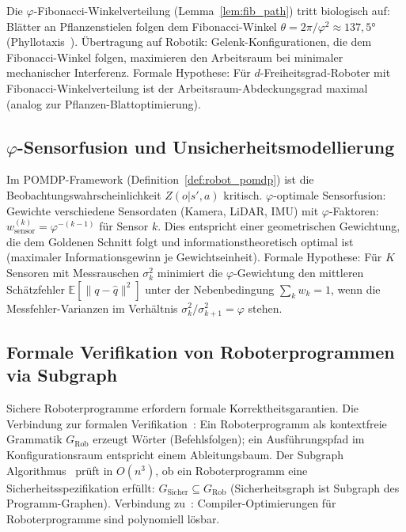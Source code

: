 ﻿\documentclass[a4paper,12pt]{article}
\theoremstyle{definition}
\begin{document}
Die $\varphi$-Fibonacci-Winkelverteilung (Lemma~\ref{lem:fib_path})
tritt biologisch auf: Bl\"atter an Pflanzenstielen folgen dem
Fibonacci-Winkel $\theta = 2\pi/\varphi^2 \approx 137{,}5 °$ (Phyllotaxis~\cite{epp2026expl}).
\"Ubertragung auf Robotik: Gelenk-Konfigurationen, die dem Fibonacci-Winkel
folgen, maximieren den Arbeitsraum bei minimaler mechanischer Interferenz.
Formale Hypothese: F\"ur $d$-Freiheitsgrad-Roboter mit Fibonacci-Winkelverteilung
ist der Arbeitsraum-Abdeckungsgrad maximal (analog zur Pflanzen-Blattoptimierung).

\subsection{$\varphi$-Sensorfusion und Unsicherheitsmodellierung}

Im POMDP-Framework (Definition~\ref{def:robot_pomdp}) ist die
Beobachtungswahrscheinlichkeit $Z(o|s',a)$ kritisch.
$\varphi$-optimale Sensorfusion: Gewichte verschiedene Sensordaten
(Kamera, LiDAR, IMU) mit $\varphi$-Faktoren:
$w_{\mathrm{sensor}}^{(k)} = \varphi^{-(k-1)}$ f\"ur Sensor $k$.
Dies entspricht einer geometrischen Gewichtung, die dem
Goldenen Schnitt folgt und informationstheoretisch optimal ist
(maximaler Informationsgewinn je Gewichtseinheit).
Formale Hypothese: F\"ur $K$ Sensoren mit Messrauschen $\sigma_k^2$
minimiert die $\varphi$-Gewichtung den mittleren Sch\"atzfehler
$\mathbb{E}[\|q - \hat{q}\|^2]$ unter der Nebenbedingung
$\sum_k w_k = 1$, wenn die Messfehler-Varianzen im Verh\"altnis
$\sigma_k^2 / \sigma_{k+1}^2 = \varphi$ stehen.

\subsection{Formale Verifikation von Roboterprogrammen via Subgraph}

Sichere Roboterprogramme erfordern formale Korrektheitsgarantien.
Die Verbindung zur formalen Verifikation~\cite{epp2026grammatik}:
Ein Roboterprogramm als kontextfreie Grammatik $G_{\mathrm{Rob}}$
erzeugt W\"orter (Befehlsfolgen); ein Ausf\"uhrungspfad im
Konfigurationsraum entspricht einem Ableitungsbaum.
Der Subgraph Algorithmus~\cite{epp2026subgraph} pr\"uft in $O(n^3)$,
ob ein Roboterprogramm eine Sicherheitsspezifikation erf\"ullt:
$G_{\mathrm{Sicher}} \subseteq G_{\mathrm{Rob}}$ (Sicherheitsgraph ist
Subgraph des Programm-Graphen).
Verbindung zu~\cite{epp2026ccl}: Compiler-Optimierungen f\"ur
Roboterprogramme sind polynomiell l\"osbar.
\end{document}
